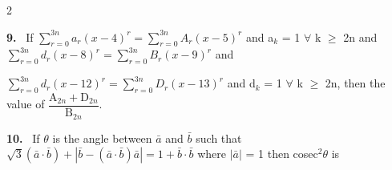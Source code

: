 \documentclass[10pt]{extarticle}
\newcommand{\qn}[1]{\par\smallskip\noindent\textbf{#1.}~}
\begin{document}
\begin{multicols}{2}
\qn{9} If $\displaystyle\sum_{r=0}^{3n}a_r(x-4)^r=\sum_{r=0}^{3n}A_r(x-5)^r$ and a$_k$ = 1 $\forall$ k $\geqslant$ 2n and $\displaystyle\sum_{r=0}^{3n}d_r(x-8)^r=\sum_{r=0}^{3n}B_r(x-9)^r$ and\par
$\displaystyle\sum_{r=0}^{3n}d_r(x-12)^r=\sum_{r=0}^{3n}D_r(x-13)^r$ and d$_k$ = 1 $\forall$ k $\geqslant$ 2n, then the value of $\dfrac{\mathrm A_{2n}+\mathrm D_{2n}}{\mathrm B_{2n}}$.
\qn{10} If $\theta$ is the angle between $\bar a$ and $\bar b$ such that $\sqrt3(\bar a\cdot\bar b)+\left|\bar b-(\bar a\cdot\bar b)\bar a\right|=1+\bar b\cdot\bar b$ where $|\bar a|$ = 1 then cosec$^2\theta$ is
\end{multicols}
\end{document}
